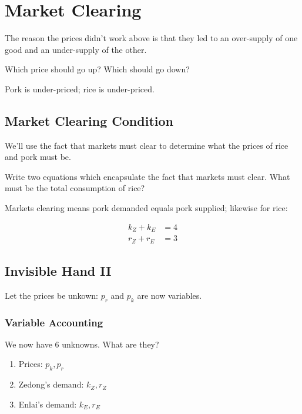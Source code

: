 \documentclass{article}
\newenvironment{solution}{\color{red}}{\color{black}}
\begin{document}
\section{Market Clearing}

The reason the prices didn't work above is that they led to an over-supply of one good and an under-supply of the other. 

Which price should go up? Which should go down?

\begin{solution}
Pork is under-priced; rice is under-priced.
\end{solution}

\subsection{Market Clearing Condition}

We'll use the fact that markets must clear to determine what the prices of rice and pork must be.

Write two equations which encapsulate the fact that markets must clear. What must be the total consumption of rice?

\begin{solution}
Markets clearing means pork demanded equals pork supplied; likewise for rice:

\begin{align*}
k_Z + k_E &= 4 \\
r_Z + r_E &= 3 
\end{align*}
\end{solution}

\subsection{Invisible Hand II} 

Let the prices be unkown: $p_r$ and $p_k$ are now variables.

\subsubsection{Variable Accounting}

We now have 6 unknowns. What are they?

\begin{solution}
\begin{enumerate}
\item Prices: $p_k, p_r$
\item Zedong's demand: $k_Z, r_Z$
\item Enlai's demand: $k_E, r_E$
\end{enumerate}
\end{solution}
\end{document}
